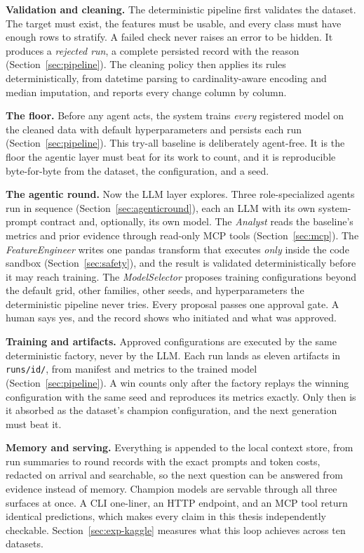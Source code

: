 \textbf{Validation and cleaning.} The deterministic pipeline first validates the dataset. The target must exist, the features must be usable, and every class must have enough rows to stratify. A failed check never raises an error to be hidden. It produces a \emph{rejected run}, a complete persisted record with the reason (Section~\ref{sec:pipeline}). The cleaning policy then applies its rules deterministically, from datetime parsing to cardinality-aware encoding and median imputation, and reports every change column by column.

\textbf{The floor.} Before any agent acts, the system trains \emph{every} registered model on the cleaned data with default hyperparameters and persists each run (Section~\ref{sec:pipeline}). This try-all baseline is deliberately agent-free. It is the floor the agentic layer must beat for its work to count, and it is reproducible byte-for-byte from the dataset, the configuration, and a seed.

\textbf{The agentic round.} Now the LLM layer explores. Three role-specialized agents run in sequence (Section~\ref{sec:agenticround}), each an LLM with its own system-prompt contract and, optionally, its own model. The \emph{Analyst} reads the baseline's metrics and prior evidence through read-only MCP tools (Section~\ref{sec:mcp}). The \emph{FeatureEngineer} writes one pandas transform that executes \emph{only} inside the code sandbox (Section~\ref{sec:safety}), and the result is validated deterministically before it may reach training. The \emph{ModelSelector} proposes training configurations beyond the default grid, other families, other seeds, and hyperparameters the deterministic pipeline never tries. Every proposal passes one approval gate. A human says yes, and the record shows who initiated and what was approved.

\textbf{Training and artifacts.} Approved configurations are executed by the same deterministic factory, never by the LLM. Each run lands as eleven artifacts in \texttt{runs/\textlangle id\textrangle/}, from manifest and metrics to the trained model (Section~\ref{sec:pipeline}). A win counts only after the factory replays the winning configuration with the same seed and reproduces its metrics exactly. Only then is it absorbed as the dataset's champion configuration, and the next generation must beat it.

\textbf{Memory and serving.} Everything is appended to the local context store, from run summaries to round records with the exact prompts and token costs, redacted on arrival and searchable, so the next question can be answered from evidence instead of memory. Champion models are servable through all three surfaces at once. A CLI one-liner, an HTTP endpoint, and an MCP tool return identical predictions, which makes every claim in this thesis independently checkable. Section~\ref{sec:exp-kaggle} measures what this loop achieves across ten datasets.

